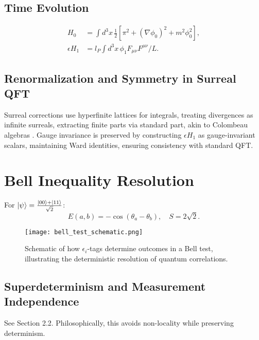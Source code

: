 \documentclass{article}
\begin{document}
\subsection{Time Evolution}
\begin{align}
H_0 &= \int d^3x \, \frac{1}{2} [\pi^2 + (\nabla \phi_0)^2 + m^2 \phi_0^2], \\
\epsilon H_1 &= l_P \int d^3x \, \phi_1 F_{\mu\nu} F^{\mu\nu} / L.
\end{align}

\subsection{Renormalization and Symmetry in Surreal QFT}
Surreal corrections use hyperfinite lattices for integrals, treating divergences as infinite surreals, extracting finite parts via standard part, akin to Colombeau algebras \cite{Grosser2001}. Gauge invariance is preserved by constructing \(\epsilon H_1\) as gauge-invariant scalars, maintaining Ward identities, ensuring consistency with standard QFT.

\section{Bell Inequality Resolution}
For \(\ket{\psi} = \frac{\ket{00} + \ket{11}}{\sqrt{2}}\):
\begin{equation}
E(a,b) = -\cos(\theta_a - \theta_b), \quad S = 2\sqrt{2}.
\end{equation}

\begin{figure}[h]
    \centering
    \texttt{[image: bell\_test\_schematic.png]}
    \caption{Schematic of how \(\epsilon_i\)-tags determine outcomes in a Bell test, illustrating the deterministic resolution of quantum correlations.}
    \label{fig:bell_test}
\end{figure}

\subsection{Superdeterminism and Measurement Independence}
See Section 2.2. Philosophically, this avoids non-locality while preserving determinism.
\end{document}
